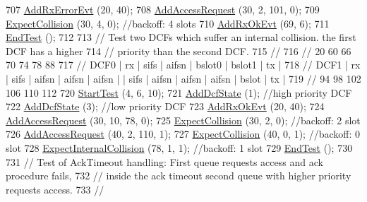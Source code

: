\begin{DoxyCode}
707   \hyperlink{classDcfManagerTest_a9e21293e0feca0c3d7b953d13c494c8d}{AddRxErrorEvt} (20, 40);
708   \hyperlink{classDcfManagerTest_a1f016026b88c036eed9ce87bfc32b71a}{AddAccessRequest} (30, 2, 101, 0);
709   \hyperlink{classDcfManagerTest_a1f78350a941a4ca0e28260c8f6390e45}{ExpectCollision} (30, 4, 0); \textcolor{comment}{//backoff: 4 slots}
710   \hyperlink{classDcfManagerTest_afc9e919cbe6497efb6a1b10d484de251}{AddRxOkEvt} (69, 6);
711   \hyperlink{classDcfManagerTest_acc78df96a60d77fdb57a9f93029dca6c}{EndTest} ();
712 
713   \textcolor{comment}{// Test two DCFs which suffer an internal collision. the first DCF has a higher}
714   \textcolor{comment}{// priority than the second DCF.}
715   \textcolor{comment}{//}
716   \textcolor{comment}{//      20          60      66      70       74       78    88}
717   \textcolor{comment}{// DCF0  |    rx     | sifs  | aifsn | bslot0 | bslot1 | tx  |}
718   \textcolor{comment}{// DCF1  |    rx     | sifs  | aifsn | aifsn  | aifsn  |     | sifs | aifsn | aifsn | aifsn | bslot |  tx
        |}
719   \textcolor{comment}{//                                                                 94      98     102     106     110   
       112}
720   \hyperlink{classDcfManagerTest_a5e7a2ff4209e9602aea95d4efa51ae91}{StartTest} (4, 6, 10);
721   \hyperlink{classDcfManagerTest_ab48a072efc828fc250036b45c3db1832}{AddDcfState} (1); \textcolor{comment}{//high priority DCF}
722   \hyperlink{classDcfManagerTest_ab48a072efc828fc250036b45c3db1832}{AddDcfState} (3); \textcolor{comment}{//low priority DCF}
723   \hyperlink{classDcfManagerTest_afc9e919cbe6497efb6a1b10d484de251}{AddRxOkEvt} (20, 40);
724   \hyperlink{classDcfManagerTest_a1f016026b88c036eed9ce87bfc32b71a}{AddAccessRequest} (30, 10, 78, 0);
725   \hyperlink{classDcfManagerTest_a1f78350a941a4ca0e28260c8f6390e45}{ExpectCollision} (30, 2, 0); \textcolor{comment}{//backoff: 2 slot}
726   \hyperlink{classDcfManagerTest_a1f016026b88c036eed9ce87bfc32b71a}{AddAccessRequest} (40, 2, 110, 1);
727   \hyperlink{classDcfManagerTest_a1f78350a941a4ca0e28260c8f6390e45}{ExpectCollision} (40, 0, 1); \textcolor{comment}{//backoff: 0 slot}
728   \hyperlink{classDcfManagerTest_a306986d8305838006b446a549da98a4e}{ExpectInternalCollision} (78, 1, 1); \textcolor{comment}{//backoff: 1 slot}
729   \hyperlink{classDcfManagerTest_acc78df96a60d77fdb57a9f93029dca6c}{EndTest} ();
730 
731   \textcolor{comment}{// Test of AckTimeout handling: First queue requests access and ack procedure fails,}
732   \textcolor{comment}{// inside the ack timeout second queue with higher priority requests access.}
733   \textcolor{comment}{//}

\end{DoxyCode}
